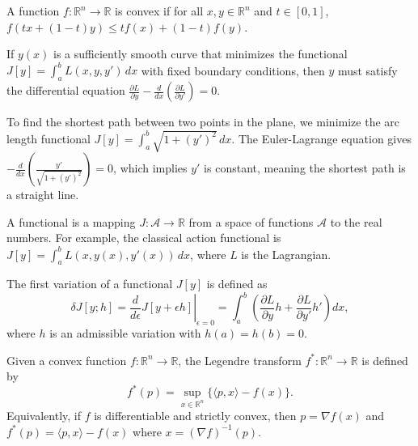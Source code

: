 \begin{definition}
A function $f: \mathbb{R}^n \to \mathbb{R}$ is convex if for all $x, y \in \mathbb{R}^n$ and $t \in [0, 1]$, $f(tx + (1-t)y) \leq t f(x) + (1-t) f(y)$.
\end{definition}

\begin{theorem}
If $y(x)$ is a sufficiently smooth curve that minimizes the functional $J[y] = \int_a^b L(x, y, y') \, dx$ with fixed boundary conditions, then $y$ must satisfy the differential equation $\frac{\partial L}{\partial y} - \frac{d}{dx} \left( \frac{\partial L}{\partial y'} \right) = 0$.
\end{theorem}

\begin{example}
To find the shortest path between two points in the plane, we minimize the arc length functional $J[y] = \int_a^b \sqrt{1 + (y')^2} \, dx$. The Euler-Lagrange equation gives $-\frac{d}{dx} \left( \frac{y'}{\sqrt{1+(y')^2}} \right) = 0$, which implies $y'$ is constant, meaning the shortest path is a straight line.
\end{example}

\begin{definition}[Functional]
A functional is a mapping $J: \mathcal{A} \to \mathbb{R}$ from a space of functions $\mathcal{A}$ to the real numbers. For example, the classical action functional is $J[y] = \int_a^b L(x, y(x), y'(x)) \, dx$, where $L$ is the Lagrangian.
\end{definition}

\begin{definition}
The first variation of a functional $J[y]$ is defined as
\[
\delta J[y; h] = \left. \frac{d}{d\epsilon} J[y + \epsilon h] \right|_{\epsilon = 0} = \int_a^b \left( \frac{\partial L}{\partial y} h + \frac{\partial L}{\partial y'} h' \right) dx,
\]
where $h$ is an admissible variation with $h(a) = h(b) = 0$.
\end{definition}

\begin{definition}
Given a convex function $f: \mathbb{R}^n \to \mathbb{R}$, the Legendre transform $f^*: \mathbb{R}^n \to \mathbb{R}$ is defined by
\[
f^*(p) = \sup_{x \in \mathbb{R}^n} \{ \langle p, x \rangle - f(x) \}.
\]
Equivalently, if $f$ is differentiable and strictly convex, then $p = \nabla f(x)$ and $f^*(p) = \langle p, x \rangle - f(x)$ where $x = (\nabla f)^{-1}(p)$.
\end{definition}

